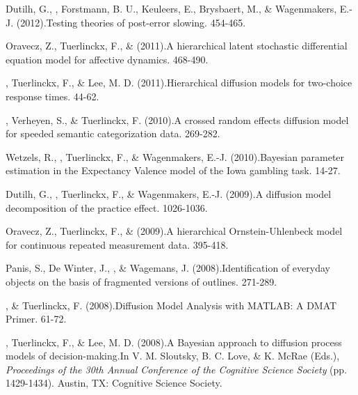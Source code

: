 \item[13.] Dutilh, G., \vdkh{}, Forstmann, B. U., Keuleers, E., Brysbaert, M., \& Wagenmakers, E.-J. (2012).\newblock Testing theories of post-error slowing. 454-465. %

\item[12.] Oravecz, Z., Tuerlinckx, F., \& \vdkh{} (2011).\newblock A hierarchical latent stochastic differential equation model for affective dynamics. 468-490. %

\item[11.] \vdkh{}, Tuerlinckx, F., \& Lee, M. D. (2011).\newblock Hierarchical diffusion models for two-choice response times. 44-62. %

\item[10.] \vdkh{}, Verheyen, S., \& Tuerlinckx, F. (2010).\newblock A crossed random effects diffusion model for speeded semantic categorization data. 269-282. %

\item[9.] Wetzels, R., \vdkh{}, Tuerlinckx, F., \& Wagenmakers, E.-J. (2010).\newblock Bayesian parameter estimation in the Expectancy Valence model of the Iowa gambling task. 14-27. %

\item[8.] Dutilh, G., \vdkh{}, Tuerlinckx, F., \& Wagenmakers, E.-J. (2009).\newblock A diffusion model decomposition of the practice effect. 1026-1036. %

\item[7.] Oravecz, Z., Tuerlinckx, F., \& \vdkh{} (2009).\newblock A hierarchical Ornstein-Uhlenbeck model for continuous repeated measurement data. 395-418. %

\item[6.] Panis, S., De Winter, J., \vdkh{}, \& Wagemans, J. (2008).\newblock Identification of everyday objects on the basis of fragmented versions of outlines. 271-289. %

\item[5.] \vdkh{}, \& Tuerlinckx, F. (2008).\newblock Diffusion Model Analysis with MATLAB: A DMAT Primer. 61-72. %

\item[4.] \vdkh{}, Tuerlinckx, F., \& Lee, M. D. (2008).\newblock A Bayesian approach to diffusion process models of decision-making.\newblock In V. M. Sloutsky, B. C. Love, \& K. McRae (Eds.), {\em Proceedings of the 30th Annual Conference of the Cognitive Science Society} (pp. 1429-1434). Austin, TX: Cognitive Science Society. %

